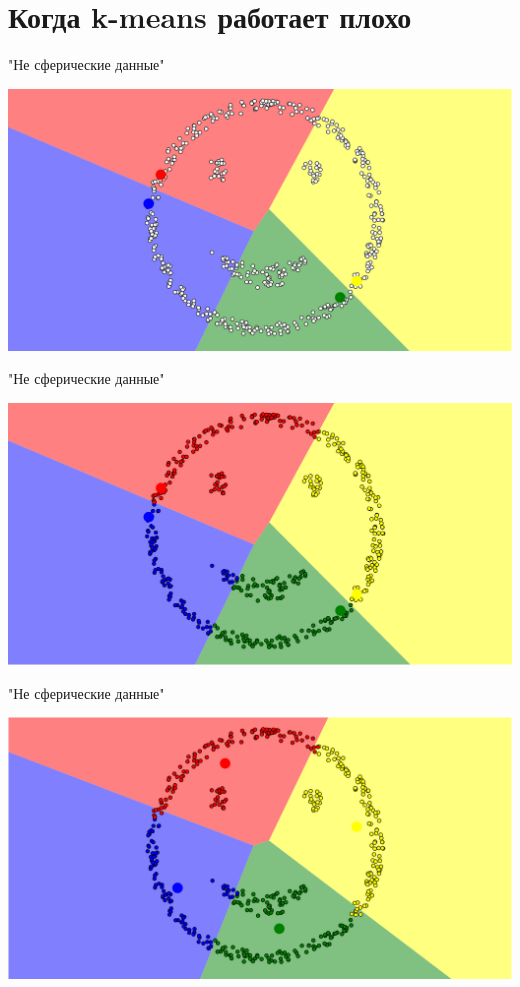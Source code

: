 \documentclass[10pt]{beamer}
\begin{document}
\section{Когда k-means работает плохо}

\begin{frame}{"Не сферические данные"}
	\begin{center}
	  \includegraphics[width=\textwidth, keepaspectratio = true]{images/non_spherical-1}  
	\end{center}
\end{frame}	

\begin{frame}{"Не сферические данные"}
	\begin{center}
	  \includegraphics[width=\textwidth, keepaspectratio = true]{images/non_spherical-2}  
	\end{center}
\end{frame}	

\begin{frame}{"Не сферические данные"}
	\begin{center}
	  \includegraphics[width=\textwidth, keepaspectratio = true]{images/non_spherical-3}  
	\end{center}
\end{frame}	
\end{document}

